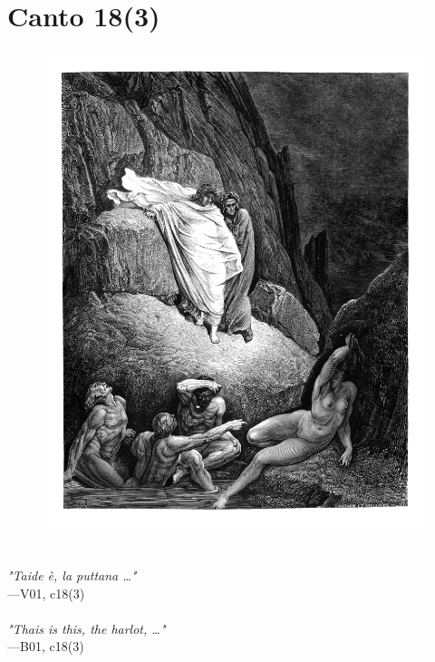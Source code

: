 \documentclass[../Dore_vision.tex]{subfiles}
\begin{document}
\newpage

\section{Canto 18(3)}

\begin{figure}[ht]
\centering
\includegraphics[height=\figsize]{illustrations/book_1/V01, c18(3).jpg}
\end{figure}

\begin{center}
\begin{minipage}{0.8\linewidth}
\textit{\\
"Taide è, la puttana …"} \\
—V01, c18(3) \\~\\
\textit{"Thais is this, the harlot, …"} \\
—B01, c18(3)
\end{minipage}
\end{center}

\newpage
\end{document}
